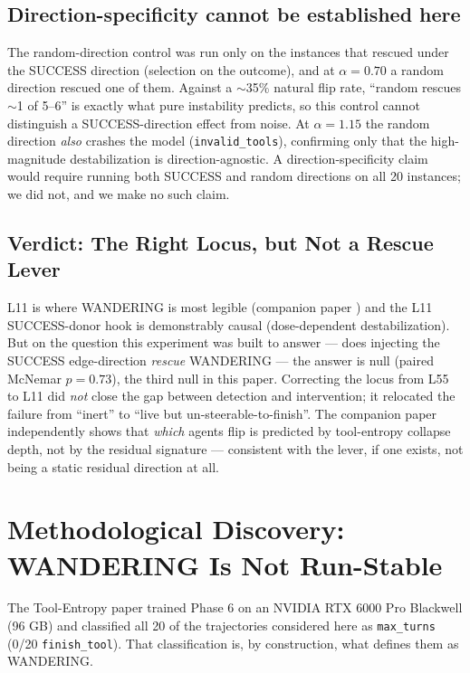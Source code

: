 \documentclass[11pt]{article}
\begin{document}
\subsection{Direction-specificity cannot be established here}

The random-direction control was run only on the instances that rescued under the SUCCESS direction (selection on the outcome), and at $\alpha=0.70$ a random direction rescued one of them. Against a $\sim$35\% natural flip rate, ``random rescues $\sim$1 of 5--6'' is exactly what pure instability predicts, so this control cannot distinguish a SUCCESS-direction effect from noise. At $\alpha=1.15$ the random direction \emph{also} crashes the model (\texttt{invalid\_tools}), confirming only that the high-magnitude destabilization is direction-agnostic. A direction-specificity claim would require running both SUCCESS and random directions on all 20 instances; we did not, and we make no such claim.

\subsection{Verdict: The Right Locus, but Not a Rescue Lever}

L11 is where WANDERING is most legible (companion paper \cite{multichannel_2026}) and the L11 SUCCESS-donor hook is demonstrably causal (dose-dependent destabilization). But on the question this experiment was built to answer --- does injecting the SUCCESS edge-direction \emph{rescue} WANDERING --- the answer is null (paired McNemar $p=0.73$), the third null in this paper. Correcting the locus from L55 to L11 did \emph{not} close the gap between detection and intervention; it relocated the failure from ``inert'' to ``live but un-steerable-to-finish''. The companion paper independently shows that \emph{which} agents flip is predicted by tool-entropy collapse depth, not by the residual signature --- consistent with the lever, if one exists, not being a static residual direction at all.

\section{Methodological Discovery: WANDERING Is Not Run-Stable}\label{sec:run_stability}

The Tool-Entropy paper trained Phase 6 on an NVIDIA RTX 6000 Pro Blackwell (96 GB) and classified all 20 of the trajectories considered here as \texttt{max\_turns} (0/20 \texttt{finish\_tool}). That classification is, by construction, what defines them as WANDERING.
\end{document}
